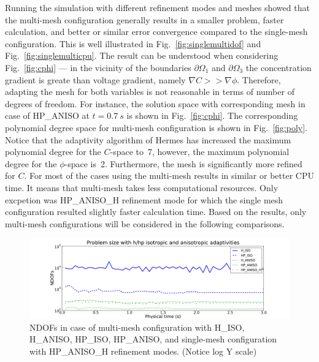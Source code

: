 Running the simulation with different refinement modes 
and meshes showed that the multi-mesh configuration generally results in
a smaller problem, faster calculation, and better or similar error convergence
compared to the single-mesh configuration.
This is well illustrated in Fig.~\ref{fig:singlemultidof} 
and Fig.~\ref{fig:singlemulticpu}.
The result can be understood when considering Fig.~\ref{fig:cphi} --- in the vicinity
of the boundaries $\partial \Omega_1$ and $\partial\Omega_3$ the concentration gradient
is greate than voltage gradient, namely $\nabla C >> \nabla \phi$. Therefore,
adapting the mesh for both variables is not reasonable in terms of
number of degrees of freedom. For instance,
the solution space with corresponding mesh in case of
HP\_ANISO at $t=0.7\ s$ is shown in Fig.~\ref{fig:cphi}. The corresponding polynomial
degree space for multi-mesh configuration is shown in Fig.~\ref{fig:poly}. 
Notice that the adaptivity algorithm
of Hermes has increased the maximum polynomial degree for the $C$-space to~7, however,
the maximum polynomial degree for the $\phi$-space is~2. Furthermore,
the mesh is significantly more refined for $C$.
For most of the cases using the multi-mesh results in similar or better CPU time.
It means that multi-mesh takes less computational resources. Only excpetion was HP\_ANISO\_H 
refinement mode for which the single mesh configuration resulted slightly faster
calculation time. 
Based on the results, only multi-mesh configurations will be considered
in the following comparisons.

\begin{figure}[!ht]
  \begin{centering}
  \includegraphics[width=\columnwidth]{isoaniso_dof}
  \caption{\label{fig:isoanisodof} NDOFs in case 
  of multi-mesh configuration with H\_ISO, H\_ANISO,
  HP\_ISO, HP\_ANISO, and single-mesh configuration with HP\_ANISO\_H
  refinement modes. (Notice log Y scale)}
  \end{centering}
\end{figure}

